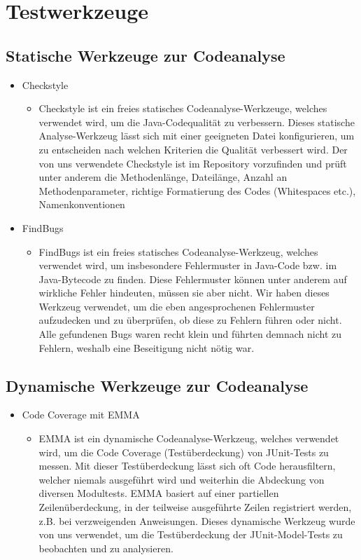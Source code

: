\section{Testwerkzeuge}
\subsection{Statische Werkzeuge zur Codeanalyse}
\begin{itemize}
\item Checkstyle
\begin{itemize} 
\item Checkstyle ist ein freies statisches Codeanalyse-Werkzeuge, welches verwendet wird, um die Java-Codequalität zu verbessern.
	Dieses statische Analyse-Werkzeug lässt sich mit einer geeigneten Datei konfigurieren, um zu entscheiden nach welchen Kriterien
	die Qualität verbessert wird. Der von uns verwendete Checkstyle ist im Repository vorzufinden und prüft unter anderem die Methodenlänge, 
	Dateilänge, Anzahl an Methodenparameter, richtige Formatierung des Codes (Whitespaces etc.), Namenkonventionen 
	\end{itemize}
\end{itemize}

\begin{itemize}
\item FindBugs
\begin{itemize} 
\item FindBugs ist ein freies statisches Codeanalyse-Werkzeug, welches verwendet wird, um insbesondere Fehlermuster in Java-Code bzw. im Java-Bytecode zu finden.
	Diese Fehlermuster können unter anderem auf wirkliche Fehler hindeuten, müssen sie aber nicht.
	Wir haben dieses Werkzeug verwendet, um die eben angesprochenen Fehlermuster aufzudecken und zu überprüfen, ob diese zu Fehlern
	führen oder nicht. Alle gefundenen Bugs waren recht klein und führten demnach nicht zu Fehlern, weshalb eine Beseitigung nicht nötig war.
\end{itemize}
\end{itemize}

\subsection{Dynamische Werkzeuge zur Codeanalyse}
\begin{itemize}
\item Code Coverage mit EMMA
\begin{itemize} 
\item EMMA ist ein dynamische Codeanalyse-Werkzeug, welches verwendet wird, um die Code Coverage (Testüberdeckung) von JUnit-Tests zu messen.
	Mit dieser Testüberdeckung lässt sich oft  Code herausfiltern, welcher niemals ausgeführt wird und weiterhin die Abdeckung von diversen Modultests.
	EMMA basiert auf einer partiellen Zeilenüberdeckung, in der teilweise ausgeführte Zeilen registriert werden, z.B. bei verzweigenden Anweisungen.
	Dieses dynamische Werkzeug wurde von uns verwendet, um die Testüberdeckung der JUnit-Model-Tests zu beobachten und zu analysieren. 
	\end{itemize}
\end{itemize}

